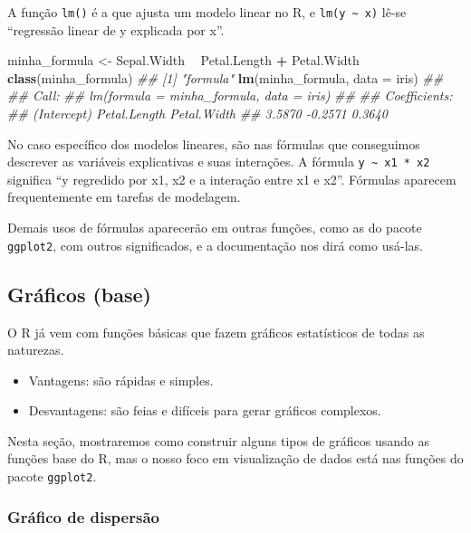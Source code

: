 \documentclass[]{book}
\newenvironment{Shaded}{\begin{snugshade}}{\end{snugshade}}
\newcommand{\CommentTok}[1]{\textcolor[rgb]{0.56,0.35,0.01}{\textit{#1}}}
\newcommand{\DataTypeTok}[1]{\textcolor[rgb]{0.13,0.29,0.53}{#1}}
\newcommand{\KeywordTok}[1]{\textcolor[rgb]{0.13,0.29,0.53}{\textbf{#1}}}
\newcommand{\NormalTok}[1]{#1}
\newcommand{\OperatorTok}[1]{\textcolor[rgb]{0.81,0.36,0.00}{\textbf{#1}}}
\newcommand{\StringTok}[1]{\textcolor[rgb]{0.31,0.60,0.02}{#1}}
\providecommand{\tightlist}{%
  \setlength{\itemsep}{0pt}\setlength{\parskip}{0pt}}
\begin{document}
A função \texttt{lm()} é a que ajusta um modelo linear no R, e \texttt{lm(y\ \textasciitilde{}\ x)} lê-se ``regressão linear de y explicada por x''.

\begin{Shaded}
\begin{Highlighting}[]
\NormalTok{minha_formula <-}\StringTok{ }\NormalTok{Sepal.Width }\OperatorTok{~}\StringTok{ }\NormalTok{Petal.Length }\OperatorTok{+}\StringTok{ }\NormalTok{Petal.Width}
\KeywordTok{class}\NormalTok{(minha_formula)}
\CommentTok{## [1] "formula"}
\KeywordTok{lm}\NormalTok{(minha_formula, }\DataTypeTok{data =}\NormalTok{ iris)}
\CommentTok{## }
\CommentTok{## Call:}
\CommentTok{## lm(formula = minha_formula, data = iris)}
\CommentTok{## }
\CommentTok{## Coefficients:}
\CommentTok{##  (Intercept)  Petal.Length   Petal.Width  }
\CommentTok{##       3.5870       -0.2571        0.3640}
\end{Highlighting}
\end{Shaded}

No caso específico dos modelos lineares, são nas fórmulas que conseguimos descrever as variáveis explicativas e suas interações. A fórmula \texttt{y\ \textasciitilde{}\ x1\ *\ x2} significa ``y regredido por x1, x2 e a interação entre x1 e x2''. Fórmulas aparecem frequentemente em tarefas de modelagem.

Demais usos de fórmulas aparecerão em outras funções, como as do pacote \texttt{ggplot2}, com outros significados, e a documentação nos dirá como usá-las.

\hypertarget{gruxe1ficos-base}{%
\subsection{Gráficos (base)}\label{gruxe1ficos-base}}

O R já vem com funções básicas que fazem gráficos estatísticos de todas as naturezas.

\begin{itemize}
\tightlist
\item
  Vantagens: são rápidas e simples.
\item
  Desvantagens: são feias e difíceis para gerar gráficos complexos.
\end{itemize}

Nesta seção, mostraremos como construir alguns tipos de gráficos usando as funções base do R, mas o nosso foco em visualização de dados está nas funções do pacote \texttt{ggplot2}.

\hypertarget{gruxe1fico-de-dispersuxe3o}{%
\subsubsection{Gráfico de dispersão}\label{gruxe1fico-de-dispersuxe3o}}
\end{document}
